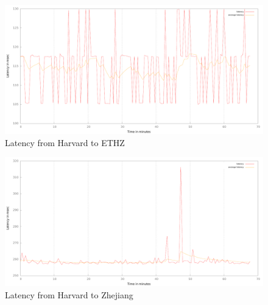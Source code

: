 \documentclass[paper=a4, fontsize=11pt]{scrartcl} %
\numberwithin{equation}{section} %
\numberwithin{figure}{section} %
\numberwithin{table}{section} %
\begin{document}
\begin{figure}[th]
\includegraphics[width=\columnwidth]{latency_harvard_ethz.pdf}
\caption{Latency from Harvard to ETHZ}
\end{figure}

\begin{figure}[th]
\includegraphics[width=\columnwidth]{latency_harvard_zhejiang.pdf}
\caption{Latency from Harvard to Zhejiang}
\end{figure}

\end{document}
